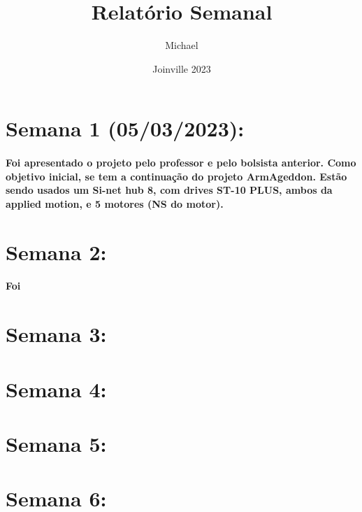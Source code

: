 \documentclass{article}
\title{Relatório Semanal}
\author{Michael}
\date{Joinville 2023}
\begin{document}
\maketitle

\newpage
\section{Semana 1 (05/03/2023):}
\paragraph{Foi apresentado o projeto pelo professor e pelo bolsista anterior. Como objetivo inicial, se tem a continuação do projeto ArmAgeddon. Estão sendo usados um Si-net hub 8, com drives ST-10 PLUS, ambos da applied motion, e 5 motores (NS do motor). }

\newpage
\section{Semana 2:}
\paragraph{Foi}

\newpage
\section{Semana 3:}
\paragraph{}

\newpage
\section{Semana 4:}
\paragraph{}

\newpage
\section{Semana 5:}
\paragraph{}

\newpage
\section{Semana 6:}
\end{document}
